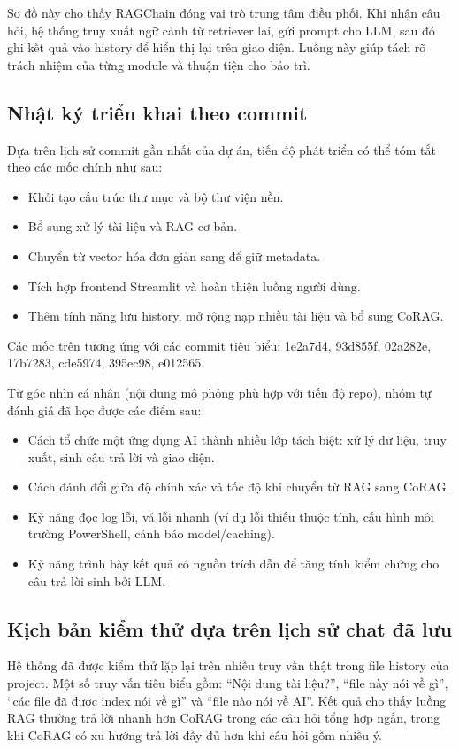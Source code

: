 \documentclass[10pt, conference, a4paper]{IEEEtran}
\begin{document}
Sơ đồ này cho thấy RAGChain đóng vai trò trung tâm điều phối. Khi nhận câu hỏi, hệ thống truy xuất ngữ cảnh từ retriever lai, gửi prompt cho LLM, sau đó ghi kết quả vào history để hiển thị lại trên giao diện. Luồng này giúp tách rõ trách nhiệm của từng module và thuận tiện cho bảo trì.

\subsection{Nhật ký triển khai theo commit}
Dựa trên lịch sử commit gần nhất của dự án, tiến độ phát triển có thể tóm tắt theo các mốc chính như sau:
\begin{itemize}
\item Khởi tạo cấu trúc thư mục và bộ thư viện nền.
\item Bổ sung xử lý tài liệu và RAG cơ bản.
\item Chuyển từ vector hóa đơn giản sang  để giữ metadata.
\item Tích hợp frontend Streamlit và hoàn thiện luồng người dùng.
\item Thêm tính năng lưu history, mở rộng nạp nhiều tài liệu và bổ sung CoRAG.
\end{itemize}
Các mốc trên tương ứng với các commit tiêu biểu: 1e2a7d4, 93d855f, 02a282e, 17b7283, cde5974, 395ec98, e012565.

Từ góc nhìn cá nhân (nội dung mô phỏng phù hợp với tiến độ repo), nhóm tự đánh giá đã học được các điểm sau:
\begin{itemize}
\item Cách tổ chức một ứng dụng AI thành nhiều lớp tách biệt: xử lý dữ liệu, truy xuất, sinh câu trả lời và giao diện.
\item Cách đánh đổi giữa độ chính xác và tốc độ khi chuyển từ RAG sang CoRAG.
\item Kỹ năng đọc log lỗi, vá lỗi nhanh (ví dụ lỗi thiếu thuộc tính, cấu hình môi trường PowerShell, cảnh báo model/caching).
\item Kỹ năng trình bày kết quả có nguồn trích dẫn để tăng tính kiểm chứng cho câu trả lời sinh bởi LLM.
\end{itemize}

\subsection{Kịch bản kiểm thử dựa trên lịch sử chat đã lưu}
Hệ thống đã được kiểm thử lặp lại trên nhiều truy vấn thật trong file history của project. Một số truy vấn tiêu biểu gồm: ``Nội dung tài liệu?'', ``file này nói về gì'', ``các file đã được index nói về gì'' và ``file nào nói về AI''. Kết quả cho thấy luồng RAG thường trả lời nhanh hơn CoRAG trong các câu hỏi tổng hợp ngắn, trong khi CoRAG có xu hướng trả lời đầy đủ hơn khi câu hỏi gồm nhiều ý.
\end{document}
